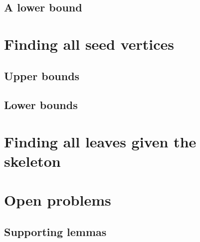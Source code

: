 \documentclass[letterpaper]{amsart}
\newcommand{\seclabel}[1]{\label{sec:#1}}
\newcommand{\applabel}[1]{\label{app:#1}}
\numberwithin{thm}{section}
\theoremstyle{definition}
\theoremstyle{plain}
\begin{document}
  \subsection{A lower bound}\seclabel{heart-lower}
  
\section{Finding all seed vertices}\seclabel{whole}
  \subsection{Upper bounds}\seclabel{whole-upper}
  
  \subsection{Lower bounds}\seclabel{whole-lower}
  
  
\section{Finding all leaves given the skeleton}\seclabel{leaves}


\section{Open problems}





\appendix

\begin{appendices}

\section{Supporting lemmas}\applabel{app}


\end{appendices}
\end{document}
